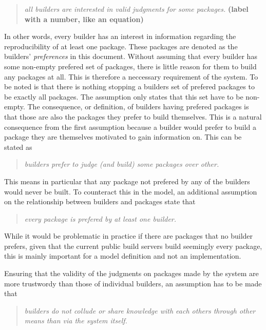 \begin{quote}
	\textit{all builders are interested in valid judgments for some packages.}
	\textbf{(label with a number, like an equation)}
\end{quote}

In other words, every builder has an interest in information regarding the reproducibility of at least one package. These packages are denoted as the builders' \textit{preferences} in this document. Without assuming that every builder has some non-empty prefered set of packages, there is little reason for them to build any packages at all. This is therefore a neccessary requirement of the system. To be noted is that there is nothing stopping a builders set of prefered packages to be exactly all packages. The assumption only states that this set have to be non-empty. The consequence, or definition, of builders having prefered packages is that those are also the packages they prefer to build themselves. This is a natural consequence from the first assumption because a builder would prefer to build a package they are themselves motivated to gain information on. This can be stated as

\begin{quote}
	\textit{builders prefer to judge (and build) some packages over other.}
\end{quote}

This means in particular that any package not prefered by any of the builders would never be built. To counteract this in the model, an additional assumption on the relationship between builders and packages state that

\begin{quote}
	\textit{every package is prefered by at least one builder.}
\end{quote}

While it would be problematic in practice if there are packages that no builder prefers, given that the current public build servers build seemingly every package, this is mainly important for a model definition and not an implementation.

Ensuring that the validity of the judgments on packages made by the system are more trustwordy than those of individual builders, an assumption has to be made that

\begin{quote}
	\textit{builders do not collude or share knowledge with each others through other means than via the system itself.}
\end{quote}

